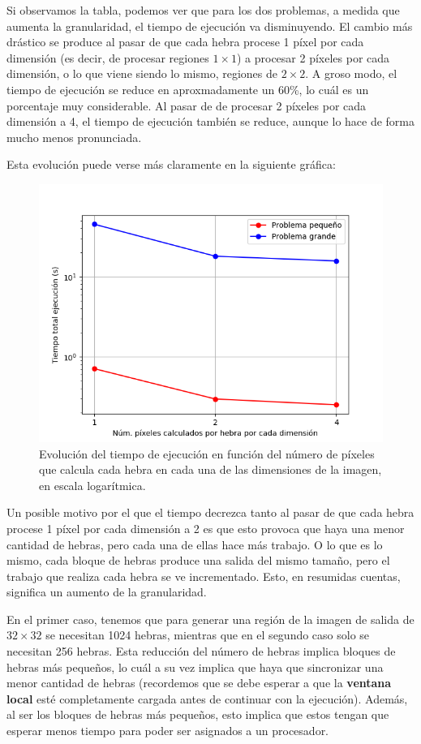 \documentclass[11pt,a4paper]{article}
\begin{document}
Si observamos la tabla, podemos ver que para los dos problemas, a medida que aumenta la
granularidad, el tiempo de ejecución va disminuyendo. El cambio más drástico se produce
al pasar de que cada hebra procese 1 píxel por cada dimensión (es decir, de procesar regiones
$1 \times 1$) a procesar 2 píxeles por cada dimensión, o lo que viene siendo lo mismo, regiones
de $2 \times 2$. A groso modo, el tiempo de ejecución se reduce en aproxmadamente un 60\%, lo
cuál es un porcentaje muy considerable. Al pasar de de procesar 2 píxeles por cada dimensión a
4, el tiempo de ejecución también se reduce, aunque lo hace de forma mucho menos pronunciada.

Esta evolución puede verse más claramente en la siguiente gráfica:

\begin{figure}[H]
  \centering
  \includegraphics[scale=0.6]{img/speed}
  \caption{Evolución del tiempo de ejecución en función del número de píxeles que calcula
  cada hebra en cada una de las dimensiones de la imagen, en escala logarítmica.}
  \label{fig:time}
\end{figure}

Un posible motivo por el que el tiempo decrezca tanto al pasar de que cada hebra procese 1
píxel por cada dimensión a 2 es que esto provoca que haya una menor cantidad de hebras, pero
cada una de ellas hace más trabajo. O lo que es lo mismo, cada bloque de hebras produce una
salida del mismo tamaño, pero el trabajo que realiza cada hebra se ve incrementado. Esto, en
resumidas cuentas, significa un aumento de la granularidad.

En el primer caso, tenemos que para generar una región de la imagen de salida de $32 \times 32$
se necesitan 1024 hebras, mientras que en el segundo caso solo se necesitan 256 hebras. Esta
reducción del número de hebras implica bloques de hebras más pequeños, lo cuál a su vez implica
que haya que sincronizar una menor cantidad de hebras (recordemos que se debe esperar a que la
\textbf{ventana local} esté completamente cargada antes de continuar con la ejecución). Además,
al ser los bloques de hebras más pequeños, esto implica que estos tengan que esperar menos tiempo
para poder ser asignados a un procesador.
\end{document}
